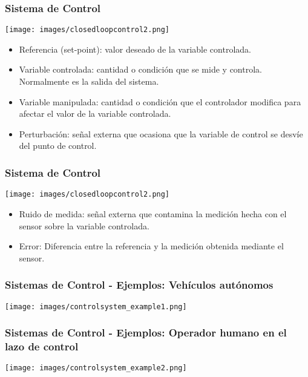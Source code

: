 \documentclass[aspectratio=169]{beamer}
\theoremstyle{definition}
\theoremstyle{plain}
\theoremstyle{remark}
\begin{document}
\begin{frame}[<+->][c]\frametitle{Sistema de Control}
  \vspace*{-0.2cm}
  \begin{center}
    \texttt{[image: images/closedloopcontrol2.png]}
  \end{center}
  \vspace*{-0.7cm}
  \begin{itemize}
    \item Referencia (set-point): valor deseado de la variable controlada.
    \item Variable controlada: cantidad o condición que se mide y controla. Normalmente es la salida del sistema.
    \item Variable manipulada: cantidad o condición que el controlador modifica para afectar el valor de la variable controlada.
    \item Perturbación: señal externa que ocasiona que la variable de control se desvíe del punto de control.
  \end{itemize}
\end{frame}

\begin{frame}[<+->][c]\frametitle{Sistema de Control}
  \vspace*{-0.2cm}
  \begin{center}
    \texttt{[image: images/closedloopcontrol2.png]}
  \end{center}
  \vspace*{-0.7cm}
  \begin{itemize}
    \item Ruido de medida: señal externa que contamina la medición hecha con el sensor sobre la variable controlada.
    \item Error: Diferencia entre la referencia y la medición obtenida mediante el sensor.
  \end{itemize}
\end{frame}

\begin{frame}[c]\frametitle{Sistemas de Control - Ejemplos: Vehículos autónomos}
  \begin{center}
    \texttt{[image: images/controlsystem\_example1.png]}
  \end{center}
\end{frame}

\begin{frame}[c]\frametitle{Sistemas de Control - Ejemplos: Operador humano en el lazo de control}
  \begin{center}
    \texttt{[image: images/controlsystem\_example2.png]}
  \end{center}
\end{frame}
\end{document}
